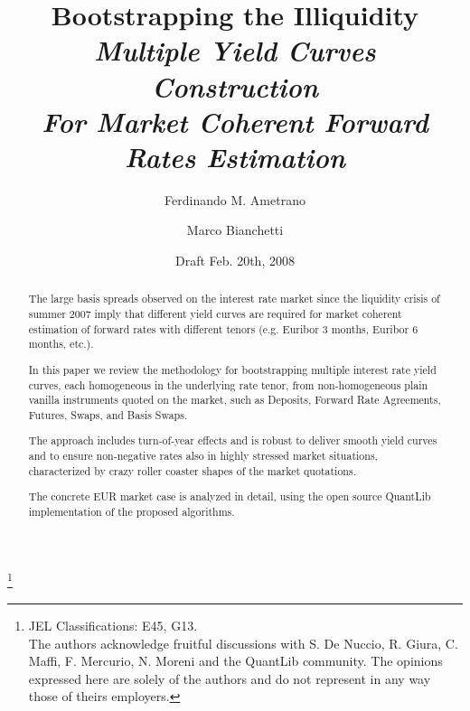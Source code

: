 \documentclass[11pt,reqno]{amsart}
\begin{document}
\title[Bootstrapping the Illiquidity]{Bootstrapping the Illiquidity \\ \footnotesize{\emph{Multiple Yield Curves Construction \\
For Market Coherent Forward Rates Estimation}}}

\author{Ferdinando M. Ametrano}
\address{Financial Engineering, Banca IMI, Piazzetta G. Dell'Amore 3, 20121
Milan Italy, ferdinando.ametrano(AT)bancaimi.com}

\author{Marco Bianchetti}
\address{Risk Management, Banca IntesaSanpaolo, Piazza G. Ferrari 10, 20121
Milan Italy, marco.bianchetti(AT)intesasanpaolo.com}

\thanks{JEL Classifications: E45, G13. \\
The authors acknowledge fruitful discussions with S. De Nuccio, R. Giura, C. Maffi, F. Mercurio, N. Moreni and the QuantLib community. The opinions expressed here are solely of the authors and do not represent in any way those of theirs employers.}

\date{Draft Feb. 20th, 2008}


\begin{abstract}
The large basis spreads observed on the interest rate market since the liquidity crisis of summer 2007 imply that different yield curves are required for market coherent estimation of forward rates with different tenors (e.g. Euribor 3 months, Euribor 6 months, etc.).
\par
In this paper we review the methodology for bootstrapping multiple interest rate yield curves, each homogeneous in the underlying rate tenor, from non-homogeneous plain vanilla instruments quoted on the market, such as Deposits, Forward Rate Agreements, Futures, Swaps, and Basis Swaps.
\par
The approach includes turn-of-year effects and is robust to deliver smooth yield curves and to ensure non-negative rates also in highly stressed market situations, characterized by crazy roller coaster shapes of the market quotations.
\par
The concrete EUR market case is analyzed in detail, using the open source QuantLib implementation of the proposed algorithms.
\end{abstract}

\maketitle
\end{document}
